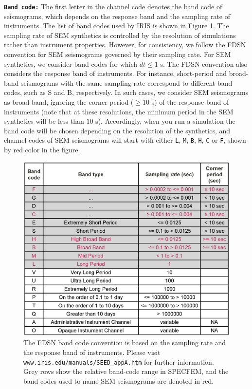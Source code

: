 \documentclass[oneside,english]{book}
\begin{document}
\noindent \textbf{\texttt{Band code:}} The first letter in the channel code denotes the band code of seismograms, which depends on the response band and the sampling rate of instruments. The list of band codes used by IRIS is shown in Figure \ref{fig:IRIS_band_codes}. The sampling rate of SEM synthetics is controlled by the resolution of simulations rather than instrument properties. However, for consistency, we follow the FDSN convention for SEM seismograms governed by their sampling rate. For SEM synthetics, we consider band codes for which $dt \leq 1$ s. The FDSN convention also considers the response band of instruments. For instance, short-period and broad-band seismograms with the same sampling rate correspond to different band codes, such as S and B, respectively. In such cases, we consider SEM seismograms as broad band, ignoring the corner period ($\geq 10$ s) of the response band of instruments (note that at these resolutions, the minimum period in the SEM synthetics will be less than $10$ s).
Accordingly, when you run a simulation the band code will be chosen depending on the resolution of the synthetics, and channel codes of SEM seismograms will start with either \texttt{L}, \texttt{M}, \texttt{B}, \texttt{H}, \texttt{C} or \texttt{F}, shown by red color in the figure.\\

\begin{figure}[ht]
\noindent \begin{centering}
\includegraphics[scale=0.6]{figures/IRIS_band_codes.eps}\caption{\label{fig:IRIS_band_codes} The FDSN band code convention is based on the sampling rate and the response band of instruments. Please visit \texttt{www.iris.edu/manuals/SEED\_appA.htm} for further information. Grey rows show the relative band-code range in SPECFEM, and the band codes used to name SEM seismograms are denoted in red.}
\par\end{centering}
\end{figure}
\end{document}
